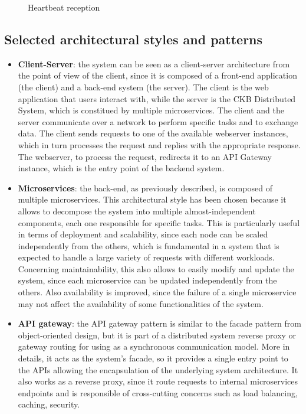 \begin{itemize}
\begin{figure}[H]
        \caption{Heartbeat reception}
    \end{figure}
\end{itemize}

\newpage
\subsection{Selected architectural styles and patterns}
\begin{itemize}
    \item \textbf{Client-Server}: the system can be seen as a client-server architecture from the point of view of the client, since it is composed of a front-end application (the client) and a back-end system (the server). The client is the web application that users interact with, while the server is the CKB Distributed System, which is constitued by multiple microservices. 
    The client and the server communicate over a network to perform specific tasks and to exchange data. The client sends requests to one of the available webserver instances, which in turn processes the request and replies with the appropriate response.
    The webserver, to process the request, redirects it to an API Gateway instance, which is the entry point of the backend system.
    \item \textbf{Microservices}: the back-end, as previously described, is composed of multiple microservices. This architectural style has been chosen because it allows to decompose the system into multiple almost-independent components, each one responsible for specific tasks.
    This is particularly useful in terms of deployment and scalability, since each node can be scaled independently from the others, which is fundamental in a system that is expected to handle a large variety of requests with different workloads.
    Concerning maintainability, this also allows to easily modify and update the system, since each microservice can be updated independently from the others.
    Also availability is improved, since the failure of a single microservice may not affect the availability of some functionalities of the system.
    \item \textbf{API gateway}: the API gateway pattern is similar to the facade pattern from object-oriented design, but it is part of a distributed system reverse proxy or gateway routing for using as a synchronous communication model.
    More in details, it acts as the system's facade, so it provides a single entry point to the APIs allowing the encapsulation of the underlying system architecture.
    It also works as a reverse proxy, since it route requests to internal microservices endpoints and is responsible of cross-cutting concerns such as load balancing, caching, security.

\end{itemize}
